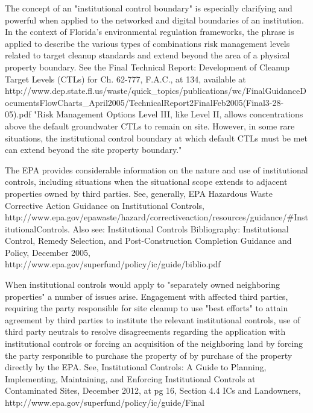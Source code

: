 The concept of an "institutional control boundary" is especially clarifying and powerful when applied to the networked and digital boundaries of an institution.
In the context of Florida's environmental regulation frameworks, the phrase is applied to describe the various types of combinations risk management levels related to target cleanup standards and extend beyond the area of a physical property boundary.
See the Final Technical Report: Development of Cleanup Target Levels (CTLs) for Ch. 62-777, F.A.C., at 134, available at http://www.dep.state.fl.us/waste/quick\_topics/publications/wc/FinalGuidanceDocumentsFlowCharts\_April2005/TechnicalReport2FinalFeb2005(Final3-28-05).pdf "Risk Management Options Level III, like Level II, allows concentrations above the default groundwater CTLs to remain on site.
However, in some rare situations, the institutional control boundary at which default CTLs must be met can extend beyond the site property boundary."

The EPA provides considerable information on the nature and use of institutional controls, including situations when the situational scope extends to adjacent properties owned by third parties.
See, generally, EPA Hazardous Waste Corrective Action Guidance on Institutional Controls, http://www.epa.gov/epawaste/hazard/correctiveaction/resources/guidance/\#InstitutionalControls.
Also see: Institutional Controls Bibliography: Institutional Control, Remedy Selection, and Post-Construction Completion Guidance and Policy, December 2005, http://www.epa.gov/superfund/policy/ic/guide/biblio.pdf

When institutional controls would apply to "separately owned neighboring properties" a number of issues arise.
Engagement with affected third parties, requiring the party responsible for site cleanup to use "best efforts" to attain agreement by third parties to institute the relevant institutional controls, use of third party neutrals to resolve disagreements regarding the application with institutional controls or forcing an acquisition of the neighboring land by forcing the party responsible to purchase the property of by purchase of the property directly by the EPA.
See, Institutional Controls: A Guide to Planning, Implementing, Maintaining, and Enforcing Institutional Controls at Contaminated Sites, December 2012, at pg 16, Section 4.4 ICs and Landowners, http://www.epa.gov/superfund/policy/ic/guide/Final%

